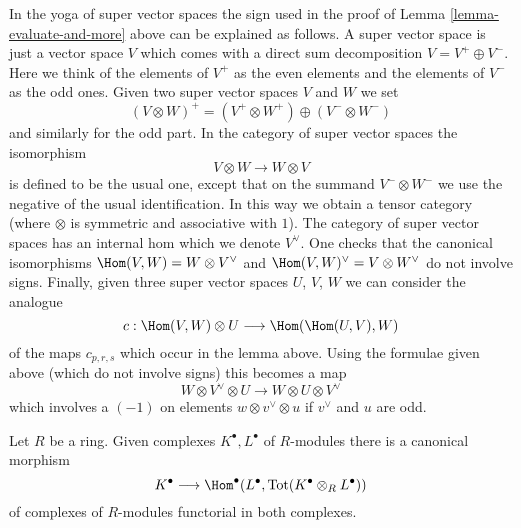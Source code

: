 \begin{remark}
\label{remark-sign-explanation}
In the yoga of super vector spaces the sign used in the proof
of Lemma \ref{lemma-evaluate-and-more} above can be explained
as follows. A super vector space is just a vector space
$V$ which comes with a direct sum decomposition $V = V^+ \oplus V^-$.
Here we think of the elements of $V^+$ as the even elements
and the elements of $V^-$ as the odd ones. Given two super
vector spaces $V$ and $W$ we set
$$
(V \otimes W)^+ = (V^+ \otimes W^+) \oplus (V^- \otimes W^-)
$$
and similarly for the odd part. In the category of super vector
spaces the isomorphism
$$
V \otimes W \longrightarrow W \otimes V
$$
is defined to be the usual one, except that on the summand
$V^- \otimes W^-$ we use the negative of the usual identification.
In this way we obtain a tensor category (where $\otimes$ is symmetric
and associative with $1$). The category of super vector spaces has
an internal hom which we denote $V^\vee$. One checks that the
canonical isomorphisms $\Hom(V, W) = W \otimes V^\vee$
and $\Hom(V, W)^\vee = V \otimes W^\vee$ do not involve signs.
Finally, given three super vector spaces
$U$, $V$, $W$ we can consider the analogue
$$
c : \Hom(V, W) \otimes U \longrightarrow \Hom(\Hom(U, V), W)
$$
of the maps $c_{p, r, s}$ which occur in the lemma above.
Using the formulae given above (which do not involve signs)
this becomes a map
$$
W \otimes V^\vee \otimes U
\longrightarrow
W \otimes U \otimes V^\vee
$$
which involves a $(-1)$ on elements $w \otimes v^\vee \otimes u$
if $v^\vee$ and $u$ are odd.
\end{remark}

\begin{lemma}
\label{lemma-diagonal}
Let $R$ be a ring. Given complexes $K^\bullet, L^\bullet$
of $R$-modules there is a canonical morphism
$$
K^\bullet
\longrightarrow
\Hom^\bullet(L^\bullet, \text{Tot}(K^\bullet \otimes_R L^\bullet))
$$
of complexes of $R$-modules functorial in both complexes.
\end{lemma}

